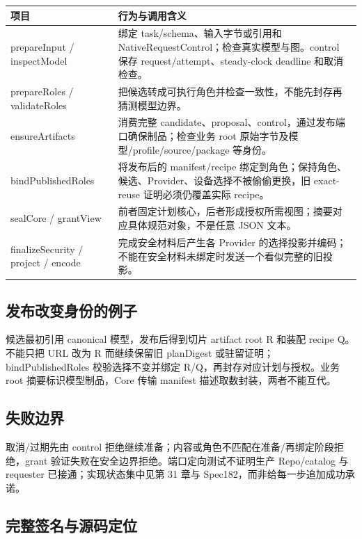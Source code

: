 \begin{longtable}{@{}p{43mm}p{119mm}@{}}
\toprule
项目 & 行为与调用含义 \\
\midrule\endhead
prepareInput / inspectModel & 绑定 task/schema、输入字节或引用和 NativeRequestControl；检查真实模型与图。control 保存 request/attempt、steady-clock deadline 和取消检查。 \\
prepareRoles / validateRoles & 把候选转成可执行角色并检查一致性，不能先封存再猜测模型边界。 \\
ensureArtifacts & 消费完整 candidate、proposal、control，通过发布端口确保制品；检查业务 root 原始字节及模型/profile/source/package 等身份。 \\
bindPublishedRoles & 将发布后的 manifest/recipe 绑定到角色；保持角色、候选、Provider、设备选择不被偷偷更换，旧 exact-reuse 证明必须仍覆盖实际 recipe。 \\
sealCore / grantView & 前者固定计划核心，后者形成授权所需视图；摘要对应具体规范对象，不是任意 JSON 文本。 \\
finalizeSecurity / project / encode & 完成安全材料后产生各 Provider 的选择投影并编码；不能在安全材料未绑定时发送一个看似完整的旧投影。 \\
\bottomrule
\end{longtable}

\subsection{发布改变身份的例子}
候选最初引用 canonical 模型，发布后得到切片 artifact root R 和装配 recipe Q。不能只把 URL 改为 R 而继续保留旧 planDigest 或驻留证明；bindPublishedRoles 校验选择不变并绑定 R/Q，再封存对应计划与授权。业务 root 摘要标识模型制品，Core 传输 manifest 描述取数封装，两者不能互代。

\subsection{失败边界}
取消/过期先由 control 拒绝继续准备；内容或角色不匹配在准备/再绑定阶段拒绝，grant 验证失败在安全边界拒绝。端口定向测试不证明生产 Repo/catalog 与 requester 已接通；实现状态集中见第 31 章与 Spec182，而非给每一步追加成功承诺。

\subsection{完整签名与源码定位}

